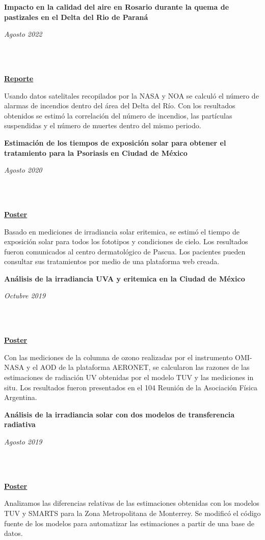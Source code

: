 \documentclass[a3paper]{adcv_color}
\newcommand{\proyect}[3]{\begin{minipage}{1\linewidth}
    \begin{minipage}{0.8\linewidth}
      \textbf{#1}
    \end{minipage}
    \begin{minipage}{0.19\linewidth}
      \begin{flushright}
        \vspace{#3cm}
        \textit{#2}
      \end{flushright}
    \end{minipage}\\
  \end{minipage}
  \vspace{0.1cm}\\
}
\begin{document}
\begin{multicols}{2}
  \proyect{Impacto en la calidad del aire en Rosario durante la quema de pastizales en el Delta del Rio de Paraná}{Agosto 2022}{-0.6}
  \href{https://rephip.unr.edu.ar/handle/2133/24201}{\textbf{Reporte}}

  Usando datos satelitales recopilados por la NASA y NOA se calculó el número de alarmas de incendios dentro del área del Delta del Río. Con los resultados obtenidos se estimó la correlación del número de incendios, las partículas suspendidas y el número de muertes dentro del mismo periodo.\\


  \columnbreak

  \proyect{Estimación de los tiempos de exposición solar para obtener el tratamiento para la Psoriasis en Ciudad de México}{Agosto 2020}{-0.2}
  \href{https://github.com/giovannilopez9808/Documents/raw/master/Posters/2020/CNF/TES/main.pdf}{\textbf{Poster}}

  Basado en mediciones de irradiancia solar eritemica, se estimó el tiempo de exposición solar para todos los fototipos y condiciones de cielo. Los resultados fueron comunicados al centro dermatológico de Pascua. Los pacientes pueden consultar sus tratamientos por medio de una plataforma web creada.\\


  \proyect{Análisis de la irradiancia UVA y eritemica en la Ciudad de México}{Octubre 2019}{-0.2}  \href{https://github.com/giovannilopez9808/Documents/raw/master/Posters/2019/AFA/Analisis%20indice%20UV/Analisis%20de%20irradiancia.pdf}{\textbf{Poster}}


    Con las mediciones de la columna de ozono realizadas por el instrumento OMI-NASA y el AOD de la plataforma AERONET, se calcularon las razones de las estimaciones de radiación UV obtenidas por el modelo TUV y las mediciones in situ. Los resultados fueron presentados en el 104 Reunión de la Asociación Física Argentina.\\

    \proyect{Análisis de la irradiancia solar con dos modelos de transferencia radiativa}{Agosto 2019}{0}
    \href{https://github.com/giovannilopez9808/Documents/raw/master/Posters/2019/CNF/Transferencia%20radiativa/main.pdf}{\textbf{Poster}}

      Analizamos las diferencias relativas de las estimaciones obtenidas con los modelos TUV y SMARTS para la Zona Metropolitana de Monterrey. Se modificó el código fuente de los modelos para automatizar las estimaciones a partir de una base de datos.\\


\end{multicols}
\end{document}
